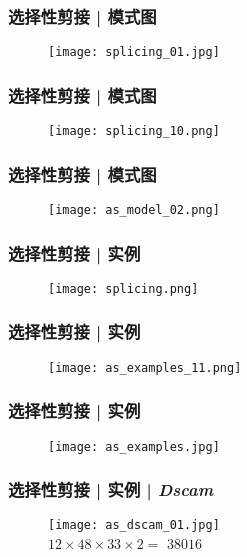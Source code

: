 \begin{frame}
  \frametitle{选择性剪接 | 模式图}
  \begin{figure}
    \centering
    \texttt{[image: splicing\_01.jpg]}
  \end{figure}
\end{frame}

\begin{frame}
  \frametitle{选择性剪接 | 模式图}
  \begin{figure}
    \centering
    \texttt{[image: splicing\_10.png]}
  \end{figure}
\end{frame}

\begin{frame}
  \frametitle{选择性剪接 | 模式图}
  \begin{figure}
    \centering
    \texttt{[image: as\_model\_02.png]}
  \end{figure}
\end{frame}

\begin{frame}
  \frametitle{选择性剪接 | 实例}
  \begin{figure}
    \centering
    \texttt{[image: splicing.png]}
  \end{figure}
\end{frame}

\begin{frame}
  \frametitle{选择性剪接 | 实例}
  \begin{figure}
    \centering
    \texttt{[image: as\_examples\_11.png]}
  \end{figure}
\end{frame}

\begin{frame}
  \frametitle{选择性剪接 | 实例}
  \begin{figure}
    \centering
    \texttt{[image: as\_examples.jpg]}
  \end{figure}
\end{frame}

\begin{frame}
  \frametitle{选择性剪接 | 实例 | \textit{Dscam}}
  \begin{figure}
    \centering
    \texttt{[image: as\_dscam\_01.jpg]}
    \\ \Large{$12 \times 48 \times 33 \times 2 = $}
    \pause
    \Large{$38016$}
  \end{figure}
\end{frame}

